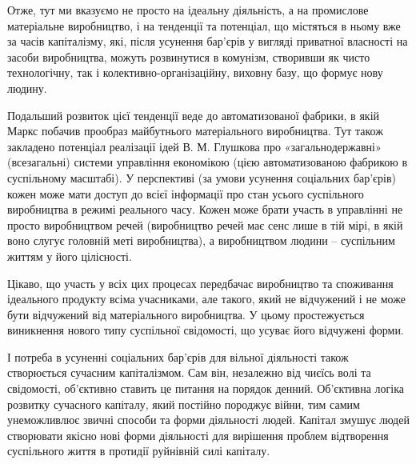 \documentclass[../main]{subfiles}
\begin{document}
Отже, тут ми вказуємо не просто на ідеальну діяльність, а на промислове матеріальне виробництво, і на тенденції та потенціал, що містяться в ньому вже за часів капіталізму, які, після усунення бар’єрів у вигляді приватної власності на засоби виробництва, можуть розвинутися в комунізм, створивши як чисто технологічну, так і колективно-організаційну, виховну базу, що формує нову людину.

Подальший розвиток цієї тенденції веде до автоматизованої фабрики, в якій Маркс побачив прообраз майбутнього матеріального виробництва. Тут також закладено потенціал реалізації ідей В. М. Глушкова про «загальнодержавні» (всезагальні) системи управління економікою (цією автоматизованою фабрикою в суспільному масштабі). У перспективі (за умови усунення соціальних бар’єрів) кожен може мати доступ до всієї інформації про стан усього суспільного виробництва в режимі реального часу. Кожен може брати участь в управлінні не просто виробництвом речей (виробництво речей має сенс лише в тій мірі, в якій воно слугує головній меті виробництва), а виробництвом людини – суспільним життям у його цілісності.

Цікаво, що участь у всіх цих процесах передбачає виробництво та споживання ідеального продукту всіма учасниками, але такого, який не відчужений і не може бути відчужений від матеріального виробництва. У цьому простежується виникнення нового типу суспільної свідомості, що усуває його відчужені форми.

І потреба в усуненні соціальних бар’єрів для вільної діяльності також створюється сучасним капіталізмом. Сам він, незалежно від чиєїсь волі та свідомості, об’єктивно ставить це питання на порядок денний. Об’єктивна логіка розвитку сучасного капіталу, який постійно породжує війни, тим самим унеможливлює звичні способи та форми діяльності людей. Капітал змушує людей створювати якісно нові форми діяльності для вирішення проблем відтворення суспільного життя в протидії руйнівній силі капіталу.
\end{document}
